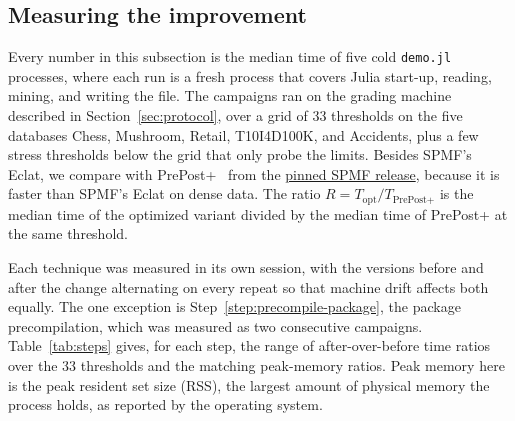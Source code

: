 \subsection{Measuring the improvement}
\label{sec:measure}
Every number in this subsection is the median time of five cold \texttt{demo.jl}
processes, where each run is a fresh process that covers Julia start-up, reading, mining,
and writing the file. The campaigns ran on the grading machine described in
Section~\ref{sec:protocol}, over a grid of 33 thresholds on the five databases Chess,
Mushroom, Retail, T10I4D100K, and Accidents, plus a few stress thresholds below the grid
that only probe the limits. Besides SPMF's Eclat, we compare with
PrePost+~\cite{deng2015} from the
\href{https://github.com/NgTHung/Itemset/blob/main/tools/spmf/release.toml}{pinned SPMF release},
because it is faster than SPMF's Eclat on dense data. The ratio
$R = T_\text{opt} / T_\text{PrePost+}$ is the median time of the optimized variant
divided by the median time of PrePost+ at the same threshold.

Each technique was measured in its own session, with the versions before and after the
change alternating on every repeat so that machine drift affects both equally. The one
exception is Step~\ref{step:precompile-package}, the package precompilation, which was
measured as two consecutive campaigns. Table~\ref{tab:steps} gives, for each step, the
range of after-over-before time ratios over the 33 thresholds and the matching
peak-memory ratios. Peak memory here is the peak resident set size (RSS), the largest
amount of physical memory the process holds, as reported by the operating system.


